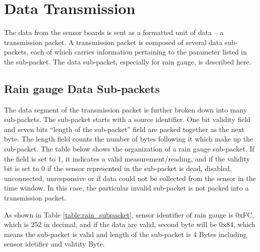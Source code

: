 \newpage

\section{Data Transmission} \label{section:overall}

The data from the sensor boards is sent as a formatted unit of data -- a transmission
packet. A transmission packet is composed of several data sub-packets, each
of which carries information pertaining to the parameter listed in the sub-packet.
The data sub-packet, especially for rain gauge, is described here.

\subsection{Rain gauge Data Sub-packets} \label{ssec:sub-pack}

The data segment of the transmission packet is further broken down into many
sub-packets. The sub-packet starts with a source identifier. One bit
validity field and seven bits ``length of the sub-packet'' field
are packed together as the next byte. The length field counts the number of
bytes following it which make up the sub-packet. The table below shows the organization
of a rain gauge sub-packet. If the field is set to 1, it indicates a valid measurement/reading, 
and if the validity bit is set to 0 if the sensor represented in the sub-packet
is dead, disabled, unconnected, unresponsive or if data could not be collected
from the sensor in the time window. In this case, the particular invalid sub-packet is not packed into a transmission packet.
\par
As shown in Table \ref{table:rain_subpacket}, sensor identifier of rain gauge is 0xFC, which is 252 in decimal,
and if the data are valid, second byte will be 0x84, which means the sub-packet is valid and length of the sub-packet is
4 Bytes including sensor idetifier and valitity Byte.


\begin{table}[H]
    \caption{Sub-packet for rain gauge}
    \label{table:rain_subpacket}
\end{table}


